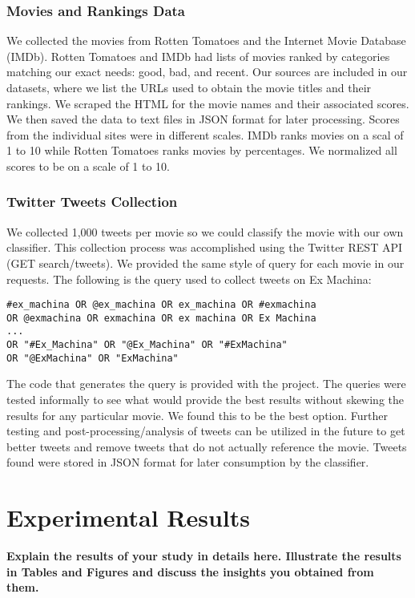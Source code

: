 \documentclass[12pt]{article}
\begin{document}
\subsubsection{Movies and Rankings Data}\label{S:4}
We collected the movies from Rotten Tomatoes and the Internet Movie Database (IMDb). Rotten Tomatoes and IMDb had lists of movies ranked by categories matching our exact needs: good, bad, and recent. Our sources are included in our datasets, where we list the URLs used to obtain the movie titles and their rankings.
We scraped the HTML for the movie names and their associated scores. We then saved the data to text files in JSON format for later processing. Scores from the individual sites were in different scales. IMDb ranks movies on a scal of 1 to 10 while Rotten Tomatoes ranks movies by percentages. We normalized all scores to be on a scale of 1 to 10.
\subsubsection{Twitter Tweets Collection}
We collected 1,000 tweets per movie so we could classify the movie with our own classifier. This collection process was accomplished using the Twitter REST API (GET search/tweets). We provided the same style of query for each movie in our requests. The following is the query used to collect tweets on Ex Machina:
\begin{verbatim}
#ex_machina OR @ex_machina OR ex_machina OR #exmachina 
OR @exmachina OR exmachina OR ex machina OR Ex Machina 
...
OR "#Ex_Machina" OR "@Ex_Machina" OR "#ExMachina" 
OR "@ExMachina" OR "ExMachina"
\end{verbatim}
The code that generates the query is provided with the project. The queries were tested informally to see what would provide the best results without skewing the results for any particular movie. We found this to be the best option. Further testing and post-processing/analysis of tweets can be utilized in the future to get better tweets and remove tweets that do not actually reference the movie.
Tweets found were stored in JSON format for later consumption by the classifier.
\section{Experimental Results}\label{S:2}
\textbf{Explain the results of your study in details here. Illustrate the results in Tables and Figures and discuss the insights you obtained from them.} \lipsum[1-9]




\end{document}
